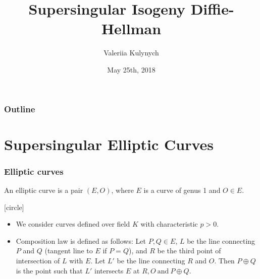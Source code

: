 \documentclass{beamer}
\title{Supersingular Isogeny Diffie-Hellman}
\author{Valeriia Kulynych}
\institute{Université de Toulon}
\date{May 25th, 2018}
\begin{document}
\begin{frame}
	\titlepage
\end{frame}

\begin{frame}
	\frametitle{Outline}
	\tableofcontents
\end{frame}

\section{Supersingular Elliptic Curves}

\begin{frame}
\frametitle{Elliptic curves}
	\begin{definition}
		An \alert{elliptic curve} is a pair $(E, O)$, where $E$ is a curve of genus 1 and $O \in E$.
	\end{definition}
	[circle]
	\begin{itemize}
		\item We consider curves defined over field $K$ with characteristic $p > 0$.
	
		 \item Composition law is defined as follows:
		Let $P, Q \in E$, $L$ be the line connecting $P$ and $Q$ (tangent line to $E$ if $P = Q$), and $R$ be the third point of intersection of $L$ with $E$. Let $L'$ be the line connecting $R$ and $O$. Then $P \oplus Q$ is the point such that $L'$ intersects $E$ at $R, O \ \text{and} \ P \oplus Q$.
	
	\end{itemize}
	

\end{frame}
\end{document}
